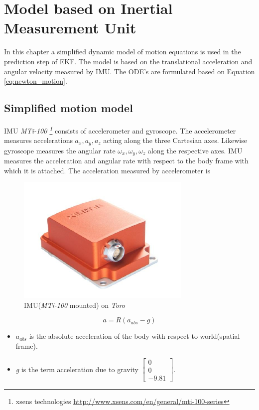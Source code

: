 \chapter{Model based on Inertial Measurement Unit}
\label{ch:simp_mdl}
In this chapter a simplified dynamic model of motion equations is used in the prediction step of EKF. The model is based on the translational acceleration and angular velocity measured by IMU. The ODE's are formulated based on Equation \ref{eq:newton_motion}.

\section{Simplified motion model}
IMU \emph{MTi-100 \footnote{xsens technologies \url{http://www.xsens.com/en/general/mti-100-series} }} consists of accelerometer and gyroscope. The accelerometer measures accelerations $a_x,a_y,a_z$ acting along the three Cartesian axes. Likewise gyroscope measures the angular rate $\omega_x,\omega_y,\omega_z$ along the respective axes. IMU measures the acceleration and angular rate with respect to the body frame with which it is attached. The acceleration measured by accelerometer is 
\begin{figure}
\begin{center}
\includegraphics[scale=0.75]{Bilder/pic_imu.png}
\caption{IMU(\emph{MTi-100} mounted) on \emph{Toro}}
\label{fig:toro_imu}
\end{center}
\end{figure}
\begin{equation}
    \label{eq:imu_acc}
    a = R(a_{abs} - g)
\end{equation}
\begin{itemize}
    \item $a_{abs} $ is the absolute acceleration of the body with respect to world(spatial frame).
    \item \emph{g} is the term acceleration due to gravity $\begin{bmatrix}0 \\ 0 \\ -9.81\end{bmatrix}$.
\end{itemize}
